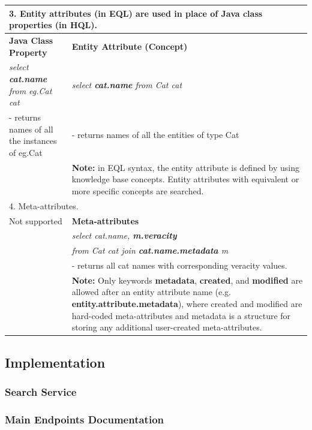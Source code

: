 \begin{table}[ht]
\begin{tabularx}{\linewidth}{|X|X|}
\multicolumn{2}{|p{0.9\linewidth}|}{3. Entity attributes (in EQL) are used in place of Java class properties (in HQL).} \\
\hline
\textbf{Java Class Property} & \textbf{Entity Attribute (Concept)} \\
\hdashline
\emph{select \textbf{cat.name} from eg.Cat cat} & \emph{select \textbf{cat.name} from Cat cat} \\
- returns names of all the instances of eg.Cat & - returns names of all the entities of type Cat \\
 & \textbf{Note:} in EQL syntax, the entity attribute is defined by using knowledge base concepts. Entity attributes with equivalent or more specific concepts are searched. \\
\hline

\multicolumn{2}{|p{0.9\linewidth}|}{4. Meta-attributes.} \\
\hline
Not supported & \textbf{Meta-attributes} \\
\hdashline
 & \emph{select cat.name, \textbf{m.veracity}} \\
 & \emph{from Cat cat join \textbf{cat.name.metadata} m} \\
 & - returns all cat names with corresponding veracity values. \\
 & \textbf{Note:} Only keywords \textbf{metadata}, \textbf{created}, and \textbf{modified} are allowed after an entity attribute name (e.g. \textbf{entity.attribute.metadata}), where created and modified are hard-coded meta-attributes and metadata is a structure for storing any additional user-created meta-attributes. \\
\hline
\end{tabularx}
\label{tab:hql_vs_eql}
\end{table}%



\subsection{Implementation}

\subsubsection{Search Service}

\subsubsection{Main Endpoints Documentation}


